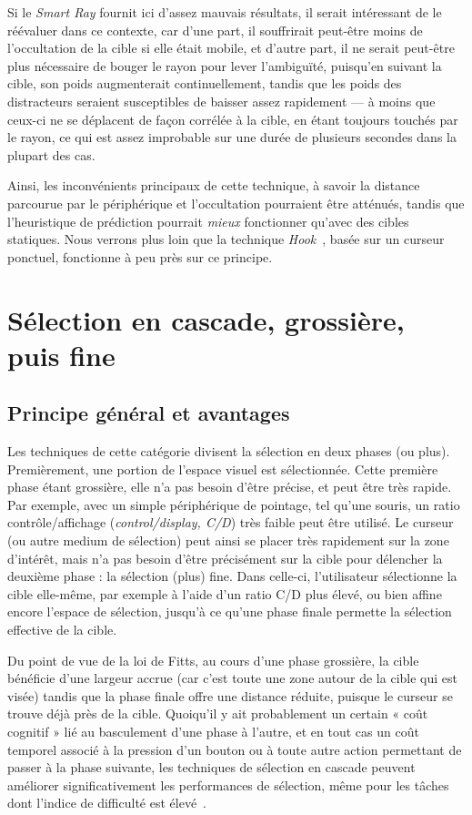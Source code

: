 	Si le \emph{Smart Ray} fournit ici d'assez mauvais résultats, il serait intéressant de le réévaluer dans ce contexte, car d'une part, il souffrirait peut-être moins de l'occultation de la cible si elle était mobile, et d'autre part, il ne serait peut-être plus nécessaire de bouger le rayon pour lever l'ambiguïté, puisqu'en suivant la cible, son poids augmenterait continuellement, tandis que les poids des distracteurs seraient susceptibles de baisser assez rapidement --- à moins que ceux-ci ne se déplacent de façon corrélée à la cible, en étant toujours touchés par le rayon, ce qui est assez improbable sur une durée de plusieurs secondes dans la plupart des cas.
	
	Ainsi, les inconvénients principaux de cette technique, à savoir la distance parcourue par le périphérique et l'occultation pourraient être atténués, tandis que l'heuristique de prédiction pourrait \emph{mieux} fonctionner qu'avec des cibles statiques. Nous verrons plus loin que la technique \emph{Hook}~\cite{ortega2013hook}, basée sur un curseur ponctuel, fonctionne à peu près sur ce principe.

\section{Sélection en cascade, grossière, puis fine}
	\subsection{Principe général et avantages}
	Les techniques de cette catégorie divisent la sélection en deux phases (ou plus). Premièrement, une portion de l'espace visuel est sélectionnée. Cette première phase étant grossière, elle n'a pas besoin d'être précise, et peut être très rapide. Par exemple, avec un simple périphérique de pointage, tel qu'une souris, un ratio contrôle/affichage (\emph{control/display, C/D}) très faible peut être utilisé. Le curseur (ou autre medium de sélection) peut ainsi se placer très rapidement sur la zone d'intérêt, mais n'a pas besoin d'être précisément sur la cible pour délencher la deuxième phase : la sélection (plus) fine. Dans celle-ci, l'utilisateur sélectionne la cible elle-même, par exemple à l'aide d'un ratio C/D plus élevé, ou bien affine encore l'espace de sélection, jusqu'à ce qu'une phase finale permette la sélection effective de la cible.
	 
	Du point de vue de la loi de Fitts, au cours d'une phase grossière, la cible bénéficie d'une largeur accrue (car c'est toute une zone autour de la cible qui est visée) tandis que la phase finale offre une distance réduite, puisque le curseur se trouve déjà près de la cible. Quoiqu'il y ait probablement un certain « coût cognitif » lié au basculement d'une phase à l'autre, et en tout cas un coût temporel associé à la pression d'un bouton ou à toute autre action permettant de passer à la phase suivante, les techniques de sélection en cascade peuvent améliorer significativement les performances de sélection, même pour les tâches dont l'indice de difficulté est élevé~\cite{kopper2011rapid}.
	

